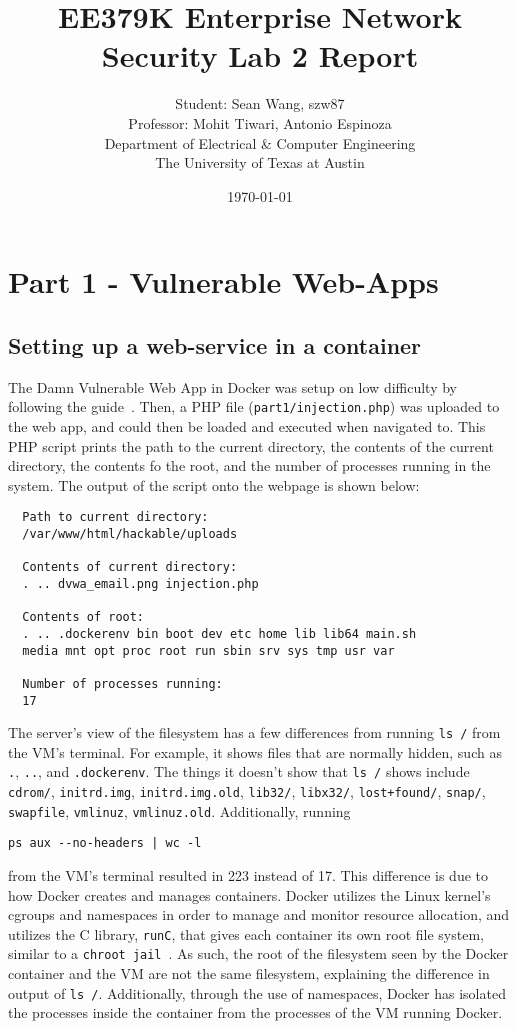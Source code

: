 \documentclass[11pt]{article}
\author{Student: Sean Wang, szw87 \\ Professor: Mohit Tiwari, Antonio Espinoza \\ Department of Electrical \& Computer Engineering \\ The University of Texas at Austin}
\date{\today}
\title{EE379K Enterprise Network Security Lab 2 Report}
\begin{document}
\maketitle
\section*{Part 1 - Vulnerable Web-Apps}
\subsection*{Setting up a web-service in a container}
The Damn Vulnerable Web App in Docker was setup on low difficulty by following the guide~\cite{dvwa}. Then, a
PHP file (\verb|part1/injection.php|) was uploaded to the web app, and could then be loaded and executed when navigated to. This PHP script
prints the path to the current directory, the contents of the current directory, the contents fo the root, and the number of processes
running in the system. The output of the script onto the webpage is shown below:
\begin{verbatim}
  Path to current directory:
  /var/www/html/hackable/uploads
  
  Contents of current directory:
  . .. dvwa_email.png injection.php
  
  Contents of root:
  . .. .dockerenv bin boot dev etc home lib lib64 main.sh
  media mnt opt proc root run sbin srv sys tmp usr var
  
  Number of processes running:
  17
\end{verbatim}

The server's view of the filesystem has a few differences from running \verb|ls /| from the VM's terminal. For example, it shows files
that are normally hidden, such as \verb|.|, \verb|..|, and \verb|.dockerenv|. The things it doesn't show that \verb|ls /| shows
include \verb|cdrom/|, \verb|initrd.img|, \verb|initrd.img.old|, \verb|lib32/|, \verb|libx32/|, \verb|lost+found/|, \verb|snap/|,
\verb|swapfile|, \verb|vmlinuz|, \verb|vmlinuz.old|. Additionally, running \begin{verbatim}ps aux --no-headers | wc -l\end{verbatim}
from the VM's terminal resulted in 223 instead of 17. This difference is due to how Docker creates and manages containers. Docker
utilizes the Linux kernel's cgroups and namespaces in order to manage and monitor resource allocation, and utilizes the C library,
\verb|runC|, that gives each container its own root file system, similar to a \verb|chroot jail|~\cite{codementor,demystify}. As such, the root
of the filesystem seen by the Docker container and the VM are not the same filesystem, explaining the difference in output of \verb|ls /|.
Additionally, through the use of namespaces, Docker has isolated the processes inside the container from the processes of the VM running
Docker.



\end{document}
